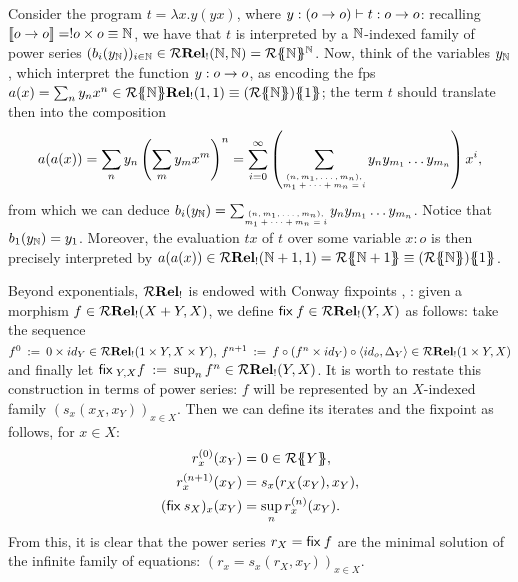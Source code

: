 \begin{example}\label{ex:churchtwo}
Consider the program $t=\lambda x.y(yx)$, where $y:(o\to o)\vdash t:o\to o$: recalling $\llbracket o\to o\rrbracket=!o\times o\equiv \mathbb{N}$, 
we have that $t$ is interpreted by a $\mathbb{N}$-indexed family of power series
$(b_i(y_{\mathbb{N}}))_{i\in\mathbb{N}}\in \mathcal{R}\mathbf{Rel_!}(\mathbb{N},\mathbb{N})={\mathcal{R}}\{\!\!\{\mathbb{N}\}\!\!\}^{\mathbb{N}}$.
Now, think of the variables $y_{\mathbb{N}}$, which interpret the function $y:o\to o$, as encoding the fps $a(x)=\sum_n y_n x^n\in\Qrelkleisli{\fps{\Rsemiring}{\N}}(1,1)\equiv  \fps{(\fps{\Rsemiring}{\N})}{1}$;
the term $t$ should translate then into the composition 
\begin{align*}
a(a(x))=\sum_n y_n\left(\sum_m y_mx^m\right)^n=
\sum_{i=0}^{\infty}
\left(
\sum_{{\tiny\begin{matrix}(n,m_1,\dots, m_n),\\ m_1+\dots+m_n=i\end{matrix}}}y_ny_{m_1}\dots y_{m_n}\right) x^i,
\end{align*}
from which we can deduce $b_i(y_{\mathbb{N}})= \sum_{{\tiny\begin{matrix}(n,m_1,\dots, m_n),\\ m_1+\dots+m_n=i\end{matrix}}}y_ny_{m_1}\dots y_{m_n}$.
Notice that $b_1(y_{\mathbb{N}})=y_1$. Moreover, the evaluation $tx$ of $t$ over some variable $x:o$ is then precisely interpreted by $a(a(x))\in \Qrelkleisli{\Rsemiring}(\N+1,1)=\fps{\Rsemiring}{\N+1}\equiv\fps{(\fps{\Rsemiring}{\N})}{1}$.
\end{example}



Beyond exponentials, 
$\mathcal{R}\mathbf{Rel_!}$ is endowed with Conway fixpoints \cite{DBLP:journals/mscs/Hasegawa09}, \cite{DBLP:conf/mfcs/GrelloisM15}: given a morphism $f \in \mathcal{R}\mathbf{Rel_!}(X + Y, X)$,  we define $\mathsf{fix}\: f \in \mathcal{R}\mathbf{Rel_!}(Y, X)$ as follows: take the sequence $f^0 \: := \:  0 \times id_Y \in \mathcal{R}\mathbf{Rel_!}(1 \times Y ,X \times Y), \: f^{n+1} \: := \: f \circ (f^n \times id_Y) \circ \langle id_o, \Delta_Y \rangle  \in \mathcal{R}\mathbf{Rel_!}(1 \times Y, X)$ and finally let $\mathsf{fix}\:_{Y,X} f \: := \: \sup_n f^n \in \mathcal{R}\mathbf{Rel_!}( Y, X)$.
   It is worth to restate this construction in terms of power series: $f$ will be represented by an $X$-indexed family $(s_x(x_X, x_Y))_{x \in X}$. Then we can define its iterates and the fixpoint as follows, for $x \in X$:
   \begin{equation}\label{eq:fixpointeq}
   \begin{aligned}
    r_x^{(0)}(x_Y) &= 0 \in {\mathcal{R}}\{\!\!\{Y\}\!\!\},\\ 
    r^{(n+1)}_x(x_Y) &=  s_x(r_X(x_Y), x_Y),\\
    (\mathsf{fix}\: s_X)_x(x_Y) &= \sup_n r^{(n)}_x(x_Y).
   	   \end{aligned}
   \end{equation} 
	From this, it is clear that the power series $r_X= \mathsf{fix}\: f$ are the minimal solution of the infinite family of equations: $(r_x = s_x(r_X, x_Y))_{x \in X}$. 
	
